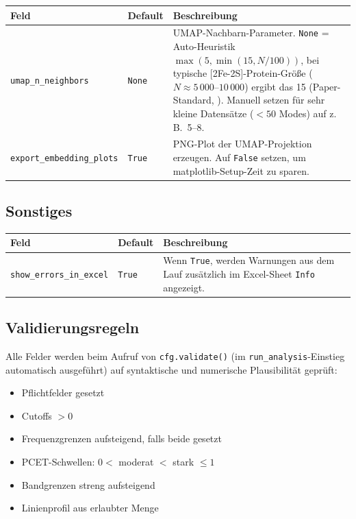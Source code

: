 \documentclass[11pt,a4paper,twoside]{article}
\theoremstyle{remark}
\begin{document}
\begin{longtable}{p{} p{} p{}}
\toprule
\textbf{Feld} & \textbf{Default} & \textbf{Beschreibung} \\
\midrule
\endhead
\texttt{umap\_n\_neighbors} & \texttt{None} & UMAP-Nachbarn-Parameter.
  \texttt{None} = Auto-Heuristik $\max(5, \min(15, N/100))$, bei
  typische [2Fe-2S]-Protein-Gr\"o{\ss}e ($N \approx 5\,000$--$10\,000$) ergibt das 15 (Paper-Standard,
  \cite{McInnes2018}). Manuell setzen f\"ur sehr kleine
  Datens\"atze ($< 50$ Modes) auf z.\,B.\ 5--8. \\
\texttt{export\_embedding\_plots} & \texttt{True} & PNG-Plot der
  UMAP-Projektion erzeugen. Auf \texttt{False} setzen, um
  matplotlib-Setup-Zeit zu sparen. \\
\bottomrule
\end{longtable}

\subsection{Sonstiges}

\begin{longtable}{p{} p{} p{}}
\toprule
\textbf{Feld} & \textbf{Default} & \textbf{Beschreibung} \\
\midrule
\endhead
\texttt{show\_errors\_in\_excel} & \texttt{True} & Wenn \texttt{True},
  werden Warnungen aus dem Lauf zus\"atzlich im Excel-Sheet
  \texttt{Info} angezeigt. \\
\bottomrule
\end{longtable}

\subsection{Validierungsregeln}

Alle Felder werden beim Aufruf von \texttt{cfg.validate()} (im
\texttt{run\_analysis}-Einstieg automatisch ausgef\"uhrt) auf
syntaktische und numerische Plausibilit\"at gepr\"uft:

\begin{itemize}
  \item Pflichtfelder gesetzt
  \item Cutoffs $> 0$
  \item Frequenzgrenzen aufsteigend, falls beide gesetzt
  \item PCET-Schwellen: $0 < $ moderat $< $ stark $\leq 1$
  \item Bandgrenzen streng aufsteigend
  \item Linienprofil aus erlaubter Menge
\end{itemize}
\end{document}
